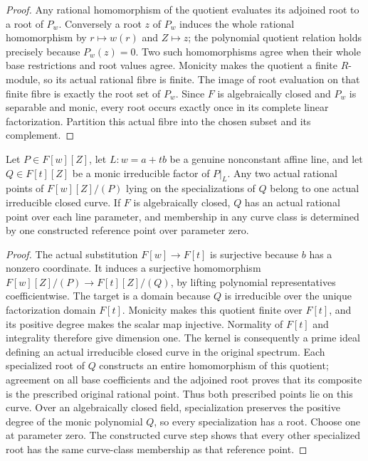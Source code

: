 \begin{proof}
Any rational homomorphism of the quotient evaluates its adjoined root to a root of $P_w$.
Conversely a root $z$ of $P_w$ induces the whole rational homomorphism by $r\mapsto w(r)$ and $Z\mapsto z$;
the polynomial quotient relation holds precisely because $P_w(z)=0$. Two such homomorphisms agree when their
whole base restrictions and root values agree. Monicity makes the quotient a finite $R$-module, so its actual
rational fibre is finite. The image of root evaluation on that finite fibre is exactly the root set of $P_w$.
Since $F$ is algebraically closed and $P_w$ is separable and monic, every root occurs exactly once in its complete
linear factorization. Partition this actual fibre into the chosen subset and its complement.
\end{proof}

\begin{lemma}\label{lem:fc-line-factor-curves}
\leanok
{}
Let $P\in F[w][Z]$, let $L\colon w=a+tb$ be a genuine nonconstant affine line, and let $Q\in F[t][Z]$
be a monic irreducible factor of $P|_L$. Any two actual rational points of $F[w][Z]/(P)$ lying on the
specializations of $Q$ belong to one actual irreducible closed curve. If $F$ is algebraically closed, $Q$
has an actual rational point over each line parameter, and membership in any curve class is determined by
one constructed reference point over parameter zero.
\end{lemma}

\begin{proof}
The actual substitution $F[w]\to F[t]$ is surjective because $b$ has a nonzero coordinate. It induces a
surjective homomorphism $F[w][Z]/(P)\to F[t][Z]/(Q)$, by lifting polynomial representatives coefficientwise.
The target is a domain because $Q$ is irreducible over the unique factorization domain $F[t]$.
Monicity makes this quotient finite over $F[t]$, and its positive degree makes the scalar map injective.
Normality of $F[t]$ and integrality therefore give dimension one. The kernel is consequently a prime ideal
defining an actual irreducible closed curve in the original spectrum. Each specialized root of $Q$ constructs
an entire homomorphism of this quotient; agreement on all base coefficients and the adjoined root proves
that its composite is the prescribed original rational point. Thus both prescribed points lie on this curve.
Over an algebraically closed field, specialization preserves the positive degree of the monic polynomial
$Q$, so every specialization has a root. Choose one at parameter zero. The constructed curve step shows
that every other specialized root has the same curve-class membership as that reference point.
\end{proof}

